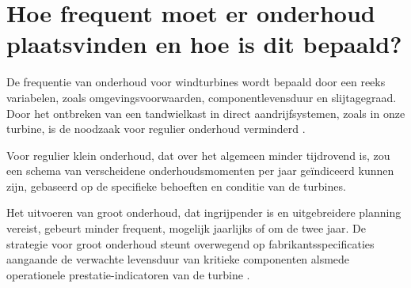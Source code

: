 






\section{Hoe frequent moet er onderhoud plaatsvinden en hoe is dit bepaald?}

De frequentie van onderhoud voor windturbines wordt bepaald door een reeks variabelen, zoals omgevingsvoorwaarden, componentlevensduur en slijtagegraad. Door het ontbreken van een tandwielkast in direct aandrijfsystemen, zoals in onze turbine, is de noodzaak voor regulier onderhoud verminderd \cite{Eneco_presentatie}.

Voor regulier klein onderhoud, dat over het algemeen minder tijdrovend is, zou een schema van verscheidene onderhoudsmomenten per jaar geïndiceerd kunnen zijn, gebaseerd op de specifieke behoeften en conditie van de turbines.

Het uitvoeren van groot onderhoud, dat ingrijpender is en uitgebreidere planning vereist, gebeurt minder frequent, mogelijk jaarlijks of om de twee jaar. De strategie voor groot onderhoud steunt overwegend op fabrikantsspecificaties aangaande de verwachte levensduur van kritieke componenten alsmede operationele prestatie-indicatoren van de turbine \cite{Eneco_presentatie}.

